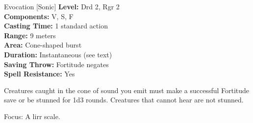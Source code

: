 {Evocation [Sonic]}
{
	\textbf{Level:}
	Drd 2, Rgr 2\\
	\textbf{Components:}
	V, S, F\\
	\textbf{Casting Time:}
	1 standard action\\
	\textbf{Range:}
	9 meters\\
	\textbf{Area:}
	Cone-shaped burst\\
	\textbf{Duration:}
	Instantaneous (see text)\\
	\textbf{Saving Throw:}
	Fortitude negates\\
	\textbf{Spell Resistance:}
	Yes\\
}
{
	Creatures caught in the cone of sound you emit must make a successful Fortitude save or be stunned for 1d3 rounds. Creatures that cannot hear are not stunned.

	Focus: A lirr scale.
}
